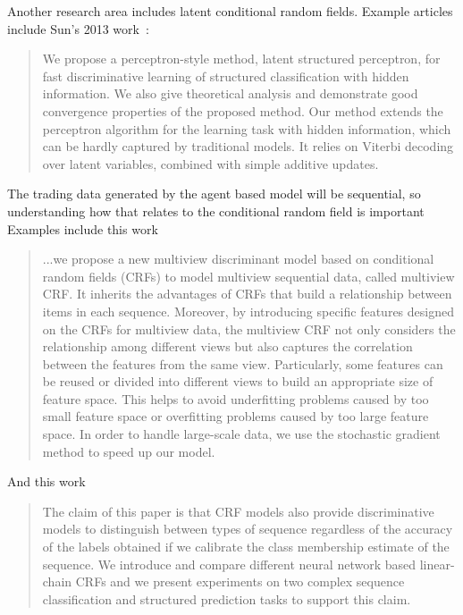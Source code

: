 \documentclass[a4paper, 11pt]{report}
\begin{document}
	Another research area includes latent conditional random fields. Example articles include Sun's 2013 work~\cite{sun2013}:
	\begin{quote}
		 We propose a perceptron-style method, latent structured perceptron, for fast discriminative learning of structured classification with hidden information. We also give theoretical analysis and demonstrate good convergence properties of the proposed method. Our method extends the perceptron algorithm for the learning task with hidden information, which can be hardly captured by traditional models. It relies on Viterbi decoding over latent variables, combined with simple additive updates.
	\end{quote}

	The trading data generated by the agent based model will be sequential, so understanding how that relates to the conditional random field is important Examples include this work ~\cite{sun2022}
	\begin{quote}
		...we propose a new multiview discriminant model based on conditional random fields (CRFs) to model multiview sequential data, called multiview CRF. It inherits the advantages of CRFs that build a relationship between items in each sequence. Moreover, by introducing specific features designed on the CRFs for multiview data, the multiview CRF not only considers the relationship among different views but also captures the correlation between the features from the same view. Particularly, some features can be reused or divided into different views to build an appropriate size of feature space. This helps to avoid underfitting problems caused by too small feature space or overfitting problems caused by too large feature space. In order to handle large-scale data, we use the stochastic gradient method to speed up our model.
	\end{quote}

	And this work ~\cite{abramson2016}
	
	\begin{quote}
		The claim of this paper is that CRF models
		also provide discriminative models to distinguish between types
		of sequence regardless of the accuracy of the labels obtained if
		we calibrate the class membership estimate of the sequence. We
		introduce and compare different neural network based linear-
		chain CRFs and we present experiments on two complex sequence
		classification and structured prediction tasks to support this
		claim.
	\end{quote}
\end{document}
